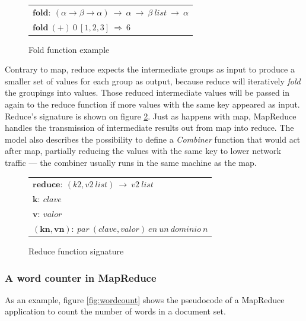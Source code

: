 \begin{figure}[tbp]
\begin{center}
\begin{tabular}{|l|}
\hline
$\mathbf{fold:} \: \left( \alpha \rightarrow \beta \rightarrow \alpha \right) \: \rightarrow \: \alpha \: \rightarrow \: \beta \: list \: \rightarrow \: \alpha$ \\
$\mathbf{fold} \: \left( \mathbf{+} \right) \: 0 \: \left[ 1,2,3 \right] \: \Rightarrow \: 6$ \\
\hline
\end{tabular}
\caption{Fold function example}
\label{fig:fold}
\end{center}
\end{figure}

Contrary to map, reduce expects the intermediate groups as input to produce a smaller set of values for each group as output, because reduce will iteratively \emph{fold} the groupings into values. Those reduced intermediate values will be passed in again to the reduce function if more values with the same key appeared as input. Reduce's signature is shown on figure \ref{fig:reduce}. Just as happens with map, MapReduce handles the transmission of intermediate results out from map into reduce. The model also describes the possibility to define a \emph{Combiner} function that would act after map, partially reducing the values with the same key to lower network traffic --- the combiner usually runs in the same machine as the map.

\begin{figure}[tbp]
\begin{center}
\begin{tabular}{|l|}
\hline
$\mathbf{reduce:} \: \left( k2,v2 \: list \right) \: \rightarrow \: v2 \: list$ \\
$\mathbf{k:} \: clave$ \\
$\mathbf{v:} \: valor$ \\
$\mathbf{\left(kn,vn \right):} \: par \: \left(clave,valor\right) \: en \: un \: dominio \: n$ \\
\hline
\end{tabular}
\caption{Reduce function signature}
\label{fig:reduce}
\end{center}
\end{figure}

\subsubsection{A word counter in MapReduce}\label{subsubsec:wordcount}
\noindent As an example, figure \ref{fig:wordcount} shows the pseudocode of a MapReduce application to count the number of words in a document set.


